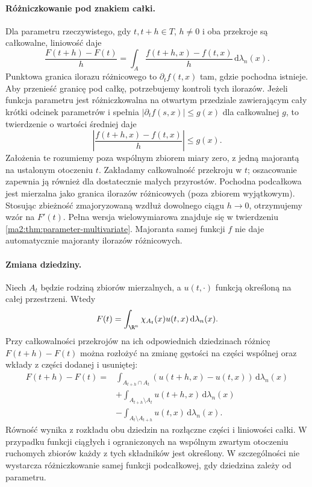 \paragraph{Różniczkowanie pod znakiem całki.}
Dla parametru rzeczywistego, gdy $t,t+h\in T$,
$h\ne0$ i oba przekroje są całkowalne,
liniowość daje
\[
 \frac{F(t+h)-F(t)}h
 =\int_A\frac{f(t+h,x)-f(t,x)}h\,
       \mathrm d\lambda_n(x).
\]
Punktowa granica ilorazu różnicowego
to $\partial_t f(t,x)$ tam, gdzie
pochodna istnieje. Aby przenieść granicę
pod całkę, potrzebujemy kontroli tych
ilorazów. Jeżeli funkcja parametru jest różniczkowalna
na otwartym przedziale zawierającym
cały krótki odcinek parametrów
i spełnia $|\partial_t f(s,x)|\le g(x)$
dla całkowalnej $g$, to twierdzenie
o wartości średniej daje
\[
 \left|\frac{f(t+h,x)-f(t,x)}h\right|\le g(x).
\]
Założenia te rozumiemy poza wspólnym
zbiorem miary zero, z jedną majorantą
na ustalonym otoczeniu $t$. Zakładamy
całkowalność przekroju w $t$; oszacowanie
zapewnia ją również dla dostatecznie
małych przyrostów. Pochodna podcałkowa
jest mierzalna jako granica ilorazów
różnicowych (poza zbiorem wyjątkowym).
Stosując zbieżność zmajoryzowaną wzdłuż
dowolnego ciągu $h\to0$, otrzymujemy
wzór na $F'(t)$.
Pełna wersja wielowymiarowa znajduje się
w twierdzeniu \ref{ma2:thm:parameter-multivariate}.
Majoranta samej funkcji $f$ nie daje
automatycznie majoranty ilorazów różnicowych.

\paragraph{Zmiana dziedziny.}
Niech $A_t$ będzie rodziną zbiorów
mierzalnych, a $u(t,\cdot)$ funkcją
określoną na całej przestrzeni.
Wtedy
\[
 F(t)=\int_{\R^n}\chi_{A_t}(x)u(t,x)\,
                   \mathrm d\lambda_n(x).
\]
Przy całkowalności przekrojów na ich
odpowiednich dziedzinach różnicę $F(t+h)-F(t)$ można rozłożyć
na zmianę gęstości na części wspólnej
oraz wkłady z części dodanej i usuniętej:
\[
 \begin{aligned}
 F(t+h)-F(t)
 ={}&\int_{A_{t+h}\cap A_t}
      (u(t+h,x)-u(t,x))\,\mathrm d\lambda_n(x)\\
 &+\int_{A_{t+h}\setminus A_t}
      u(t+h,x)\,\mathrm d\lambda_n(x)\\
 &-\int_{A_t\setminus A_{t+h}}
      u(t,x)\,\mathrm d\lambda_n(x).
 \end{aligned}
\]
Równość wynika z rozkładu obu dziedzin
na rozłączne części i liniowości całki.
W przypadku funkcji ciągłych i
ograniczonych na wspólnym zwartym
otoczeniu ruchomych zbiorów każdy
z tych składników jest określony.
W szczególności nie wystarcza
różniczkowanie samej funkcji podcałkowej,
gdy dziedzina zależy od parametru.

